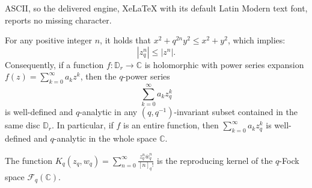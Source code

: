 \documentclass[10pt,a4paper]{amsart}
\renewcommand{\bar}[1]{\overline{#1}}
\begin{document}
ASCII, so the delivered engine, XeLaTeX with its default Latin Modern text font, reports no missing character.
\begin{remark}\label{remnorm}
For any positive integer $n$, it holds that $x^2 + q^{2n}y^2 \leq x^2 + y^2$, which implies:
\[
|z_q^n| \leq |z^n|.
\]
Consequently, if a function $f : \mathbb{D}_r \to \mathbb{C}$ is holomorphic with power series expansion $f(z) = \sum_{k=0}^\infty a_k z^k$, then the $q$-power series
\[
\sum_{k=0}^\infty a_k z_q^k
\]
is well-defined and $q$-analytic in any $(q,q^{-1})$-invariant subset contained in the same disc $\mathbb{D}_r$. In particular, if $f$ is an entire function, then $\sum_{k=0}^\infty a_k z_q^k$ is
well-defined and $q$-analytic in the whole space $\mathbb{C}$.
\end{remark}

\begin{theorem}
The function $K_q(z_{q},w_{q}) = \sum_{n=0}^{\infty} \frac{z_q^n\bar{w}_q^n}{[n]_q!}$ is the reproducing kernel of the $q$-Fock space $\mathcal{F}_q(\mathbb{C})$.
\end{theorem}
\end{document}
